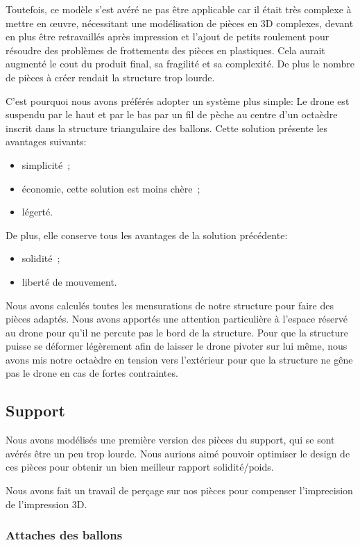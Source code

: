 \documentclass[a4paper,11pt]{article}
\begin{document}
Toutefois, ce modèle s'est avéré ne pas être applicable car il était très complexe à mettre en œuvre, nécessitant une modélisation de pièces en 3D complexes, devant en plus être retravaillés après impression et l'ajout de petits roulement pour résoudre des problèmes de frottements des pièces en plastiques. Cela aurait augmenté le cout du produit final, sa fragilité et sa complexité. De plus le nombre de pièces à créer rendait la structure trop lourde.

C'est pourquoi nous avons préférés adopter un système plus simple:
Le drone est suspendu par le haut et par le bas par un fil de pèche au centre d'un octaèdre inscrit dans la structure triangulaire des ballons. Cette solution présente les avantages suivants:
\begin{itemize}
	\item simplicité~;
	\item économie, cette solution est moins chère~;
	\item légerté.
\end{itemize}

De plus, elle conserve tous les avantages de la solution précédente:
\begin{itemize}
	\item solidité~;
	\item liberté de mouvement.
\end{itemize}

Nous avons calculés toutes les mensurations de notre structure pour faire des pièces adaptés. Nous avons apportés une attention particulière à l'espace réservé au drone pour qu'il ne percute pas le bord de la structure. Pour que la structure puisse se déformer légèrement afin de laisser le drone pivoter sur lui même, nous avons mis notre octaèdre en tension vers l'extérieur pour que la structure ne gêne pas le drone en cas de fortes contraintes.

\subsection{Support}

Nous avons modélisés une première version des pièces du support, qui se sont avérés être un peu trop lourde. Nous aurions aimé pouvoir optimiser le design de ces pièces pour obtenir un bien meilleur rapport solidité/poids.

Nous avons fait un travail de perçage sur nos pièces pour compenser l'imprecision de l'impression 3D.

\subsubsection{Attaches des ballons}
\end{document}
